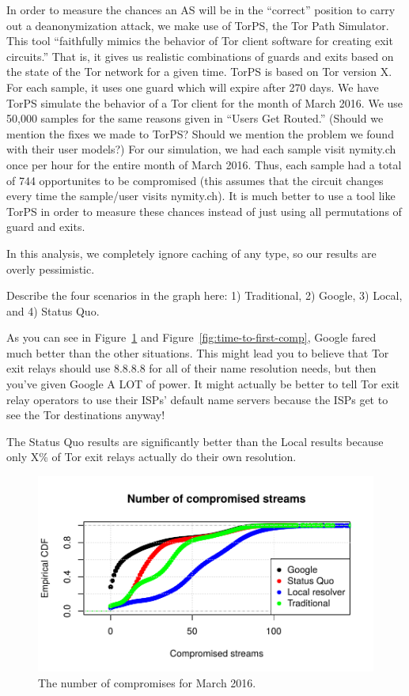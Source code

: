In order to measure the chances an AS will be in the ``correct'' position to carry out a
deanonymization attack, we make use of TorPS, the Tor Path Simulator. This tool 
``faithfully mimics the behavior of Tor client software for creating exit circuits.''
That is, it gives us realistic combinations of guards and exits based on the state of the 
Tor network for a given time. TorPS is based on Tor version X. For each sample, it uses 
one guard which will expire after 270 days. We have TorPS simulate the behavior of a Tor 
client for the month of March 2016. We use 50,000 samples for the same reasons given in
``Users Get Routed.'' (Should we mention the fixes we made to TorPS? Should we mention 
the problem we found with their user models?) For our simulation, we had each sample 
visit nymity.ch once per hour for the entire month of March 2016. Thus, each sample had 
a total of 744 opportunites to be compromised (this assumes that the circuit changes 
every time the sample/user visits nymity.ch). It is much better to use a tool like TorPS 
in order to measure these chances instead of just using all permutations of guard and 
exits.

In this analysis, we completely ignore caching of any type, so our results are overly 
pessimistic.

Describe the four scenarios in the graph here: 1) Traditional, 2) Google, 3) Local, and 
4) Status Quo.

As you can see in Figure~\ref{fig:num-compromises} and Figure~\ref{fig:time-to-first-comp}, 
Google fared much better than the other situations. This might lead you to believe that 
Tor exit relays should use 8.8.8.8 for all of their name resolution needs, but then you've 
given Google A LOT of power. It might actually be better to tell Tor exit relay operators 
to use their ISPs' default name servers because the ISPs get to see the Tor destinations 
anyway!

The Status Quo results are significantly better than the Local results because only X\% 
of Tor exit relays actually do their own resolution.

\begin{figure}[t]
	\centering
	\includegraphics[width=0.75\linewidth]{figures/num-compromised-streams.pdf}
	\caption{The number of compromises for March 2016.}
	\label{fig:num-compromises}
\end{figure}

